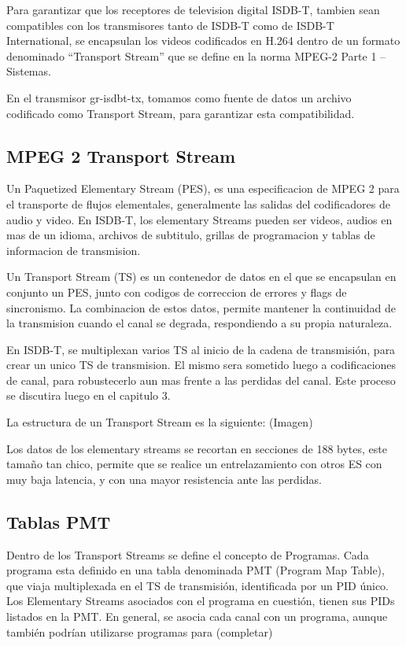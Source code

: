 Para garantizar que los receptores de television digital ISDB-T, tambien sean compatibles con los transmisores tanto de ISDB-T como de ISDB-T International, se encapsulan los videos codificados en H.264 dentro de un formato denominado “Transport Stream” que se define en la norma MPEG-2 Parte 1 – Sistemas.

En el transmisor gr-isdbt-tx, tomamos como fuente de datos un archivo codificado como Transport Stream, para garantizar esta compatibilidad.
	\subsection{MPEG 2 Transport Stream}
	

Un Paquetized Elementary Stream (PES), es una especificacion de MPEG 2 para el transporte de flujos elementales, generalmente las salidas del codificadores de audio y video. En ISDB-T, los elementary Streams pueden ser videos, audios en mas de un idioma, archivos de subtitulo, grillas de programacion y tablas de informacion de transmision.

Un Transport Stream (TS) es un contenedor de datos en el que se encapsulan en conjunto un PES, junto con codigos de correccion de errores y flags de sincronismo. La combinacion de estos datos, permite mantener la continuidad de la transmision cuando el canal se degrada, respondiendo a su propia naturaleza. 

En ISDB-T, se multiplexan varios TS al inicio de la cadena de transmisión, para crear un unico TS de transmision. El mismo sera sometido luego a codificaciones de canal, para robustecerlo aun mas frente a las perdidas del canal. Este proceso se discutira luego en el capitulo 3.

La estructura de un Transport Stream es la siguiente:
(Imagen)

Los datos de los elementary streams se recortan en secciones de 188 bytes, este tamaño tan chico, permite que se realice un entrelazamiento con otros ES con muy baja latencia, y con una mayor resistencia ante las perdidas.

	\subsection{Tablas PMT}

Dentro de los Transport Streams se define el concepto de Programas. Cada programa esta definido en una tabla denominada PMT (Program Map Table), que viaja multiplexada en el TS de transmisión, identificada por un PID único. Los Elementary Streams asociados con el programa en cuestión, tienen sus PIDs listados en la PMT. En general, se asocia cada canal con un programa, aunque también podrían utilizarse programas para (completar)

